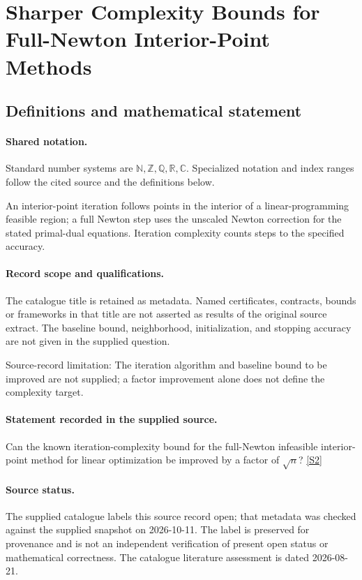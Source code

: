\documentclass[11pt]{article}
\newcommand{\sref}[2]{\hyperlink{source:#1:#2}{[S#2]}}
\begin{document}
\section{Sharper Complexity Bounds for Full-Newton Interior-Point Methods}\label{statement}

\subsection{Definitions and mathematical statement}

\paragraph{Shared notation.}Standard number systems are $\mathbb N,\mathbb Z,\mathbb Q,\mathbb R,\mathbb C$. Specialized notation and index ranges follow the cited source and the definitions below.


An interior-point iteration follows points in the interior of a linear-programming feasible region; a full Newton step uses the unscaled Newton correction for the stated primal-dual equations. Iteration complexity counts steps to the specified accuracy.
\paragraph{Record scope and qualifications.}
The catalogue title is retained as metadata. Named certificates, contracts, bounds or frameworks in that title are not asserted as results of the original source extract.
The baseline bound, neighborhood, initialization, and stopping accuracy are not given in the supplied question.

Source-record limitation: The iteration algorithm and baseline bound to be improved are not supplied; a factor improvement alone does not define the complexity target.
\paragraph{Statement recorded in the supplied source.}
Can the known iteration-complexity bound for the full-Newton infeasible interior-point method for linear optimization be improved by a factor of $\sqrt n$? \sref{statement}{2}
\paragraph{Source status.}
The supplied catalogue labels this source record open; that metadata was checked against the supplied snapshot on 2026-10-11. The label is preserved for provenance and is not an independent verification of present open status or mathematical correctness. The catalogue literature assessment is dated 2026-08-21.
\end{document}
